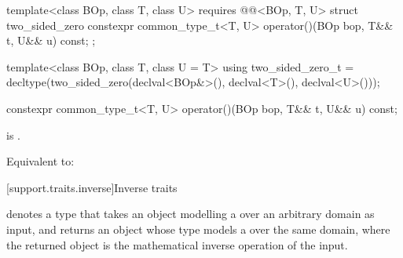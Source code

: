 \begin{itemdecl}
  template<class BOp, class T, class U>
  requires @@<BOp, T, U>
  struct two_sided_zero {
     constexpr common_type_t<T, U> operator()(BOp bop, T&& t, U&& u) const;
  };

  template<class BOp, class T, class U = T>
  using two_sided_zero_t =
    decltype(two_sided_zero{}(declval<BOp&>(), declval<T>(), declval<U>()));
\end{itemdecl}

\begin{itemdecl}
constexpr common_type_t<T, U> operator()(BOp bop, T&& t, U&& u) const;
\end{itemdecl}
\begin{itemdescr}
   \pnum
   \expects {} is .

   \pnum
   \effects Equivalent to:
   \begin{codeblock}
      return left_zero<BOp, T, U>();}
   \end{codeblock}
\end{itemdescr}

[support.traits.inverse]{Inverse traits}


\pnum
{} denotes a type that takes an object modelling a  over an
arbitrary domain as input, and returns an object whose type models a  over the same
domain, where the returned object is the mathematical inverse operation of the input.

